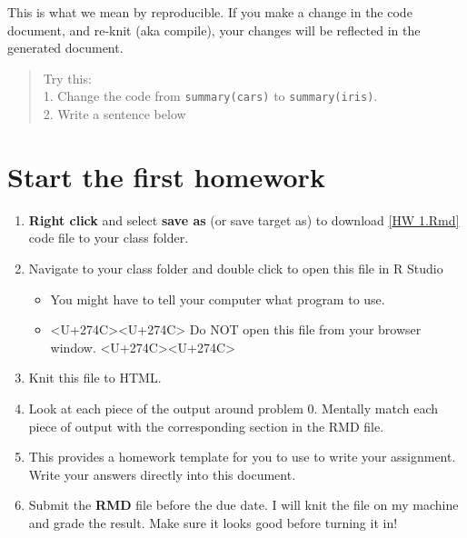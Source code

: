 \documentclass[]{article}
\providecommand{\tightlist}{%
  \setlength{\itemsep}{0pt}\setlength{\parskip}{0pt}}
\begin{document}
This is what we mean by reproducible. If you make a change in the code
document, and re-knit (aka compile), your changes will be reflected in
the generated document.

\begin{quote}
Try this:\\
1. Change the code from \texttt{summary(cars)} to
\texttt{summary(iris)}.\\
2. Write a sentence below
\end{quote}

\hypertarget{start-the-first-homework}{%
\section{Start the first homework}\label{start-the-first-homework}}

\begin{enumerate}
\def\labelenumi{\arabic{enumi}.}
\tightlist
\item
  \textbf{Right click} and select \textbf{save as} (or save target as)
  to download \href{../hw/HW1.Rmd}{{[}HW 1.Rmd{]}} code file to your
  class folder.
\item
  Navigate to your class folder and double click to open this file in R
  Studio

  \begin{itemize}
  \tightlist
  \item
    You might have to tell your computer what program to use.
  \item
    \textless{}U+274C\textgreater{}\textless{}U+274C\textgreater{} Do
    NOT open this file from your browser window.
    \textless{}U+274C\textgreater{}\textless{}U+274C\textgreater{}
  \end{itemize}
\item
  Knit this file to HTML.
\item
  Look at each piece of the output around problem 0. Mentally match each
  piece of output with the corresponding section in the RMD file.
\item
  This provides a homework template for you to use to write your
  assignment. Write your answers directly into this document.
\item
  Submit the \textbf{RMD} file before the due date. I will knit the file
  on my machine and grade the result. Make sure it looks good before
  turning it in!
\end{enumerate}
\end{document}
